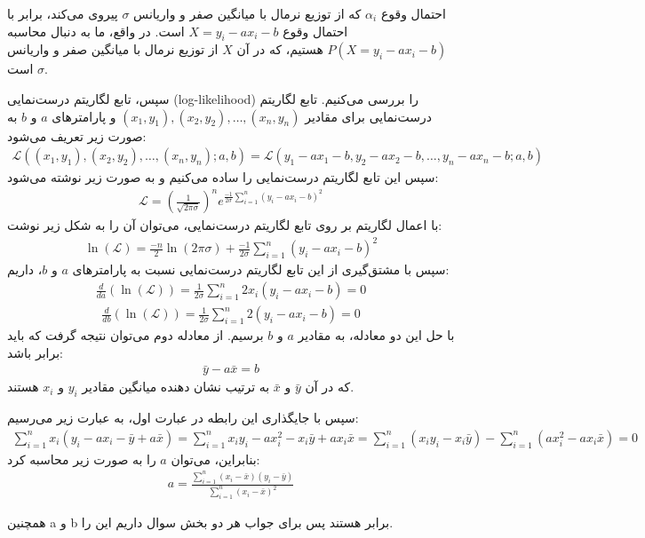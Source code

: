 احتمال وقوع $\alpha_i$ که از توزیع نرمال با میانگین صفر و واریانس $\sigma$ پیروی می‌کند، برابر با احتمال وقوع $X = y_i - ax_i - b$ است. در واقع، ما به دنبال محاسبه $P(X = y_i - ax_i - b)$ هستیم، که در آن $X$ از توزیع نرمال با میانگین صفر و واریانس $\sigma$ است.

سپس، تابع لگاریتم درست‌نمایی (log-likelihood) را بررسی می‌کنیم. تابع لگاریتم درست‌نمایی برای مقادیر $(x_1, y_1), (x_2, y_2), \dots, (x_n, y_n)$ و پارامترهای $a$ و $b$ به صورت زیر تعریف می‌شود:
\begin{align*}
	\mathcal{L}((x_1,y_1), (x_2,y_2), \dots, (x_n,y_n); a, b) = \mathcal{L}(y_1 - ax_1 - b, y_2 - ax_2 - b, \dots, y_n - ax_n - b; a, b)
\end{align*}
سپس این تابع لگاریتم درست‌نمایی را ساده می‌کنیم و به صورت زیر نوشته می‌شود:
\begin{align*}
	\mathcal{L} = (\frac{1}{\sqrt{2 \pi \sigma}})^n e^{\frac{-1}{2\sigma} \sum_{i=1}^n (y_i - ax_i - b)^2}
\end{align*}
با اعمال لگاریتم بر روی تابع لگاریتم درست‌نمایی، می‌توان آن را به شکل زیر نوشت:
\begin{align*}
	\ln(\mathcal{L}) = \frac{-n}{2}\ln(2 \pi \sigma) + \frac{-1}{2\sigma} \sum_{i=1}^n (y_i - ax_i - b)^2
\end{align*}
سپس با مشتق‌گیری از این تابع لگاریتم درست‌نمایی نسبت به پارامترهای $a$ و $b$، داریم:
\begin{align*}
	\frac{d}{d a}(\ln(\mathcal{L})) = \frac{1}{2\sigma} \sum_{i=1}^n 2x_i (y_i - ax_i - b) = 0
\end{align*}
\begin{align*}
	\frac{d}{d b}(\ln(\mathcal{L})) = \frac{1}{2\sigma} \sum_{i=1}^n 2 (y_i - ax_i - b) = 0
\end{align*}
با حل این دو معادله، به مقادیر $a$ و $b$ برسیم. از معادله دوم می‌توان نتیجه گرفت که باید برابر باشد:
\begin{align*}
	\bar{y} - a\bar{x} = b
\end{align*}
که در آن $\bar{y}$ و $\bar{x}$ به ترتیب نشان دهنده میانگین مقادیر $y_i$ و $x_i$ هستند.

سپس با جایگذاری این رابطه در عبارت اول، به عبارت زیر می‌رسیم:
\begin{align*}
	\sum_{i=1}^n x_i (y_i - ax_i - \bar{y} + a\bar{x}) = \sum_{i=1}^n x_i y_i - ax_i^2 - x_i\bar{y} + ax_i\bar{x}
	= \sum_{i=1}^n (x_i y_i - x_i\bar{y}) - \sum_{i=1}^n (ax_i^2 - ax_i\bar{x}) = 0
\end{align*}
بنابراین، می‌توان $a$ را به صورت زیر محاسبه کرد:
\begin{align*}
	a = \frac{\sum_{i=1}^{n} (x_i-\bar{x})(y_i-\bar{y})}{\sum_{i=1}^n (x_i-\bar{x})^2}
\end{align*}

همچنین a و b برابر هستند پس برای جواب هر دو بخش سوال داریم این را.